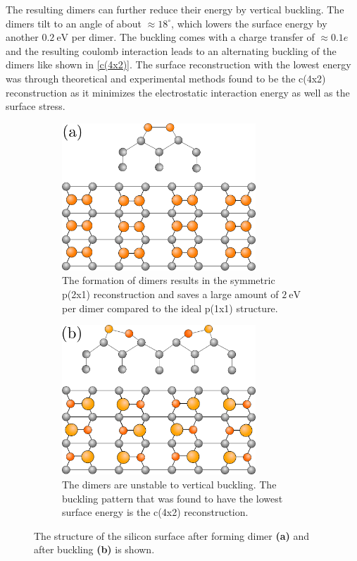	The resulting dimers can further reduce their energy by vertical buckling. The dimers tilt to an angle of about $\approx 18^\circ$, which lowers the surface energy by another $0.2~\text{eV}$ per dimer. The buckling comes with a charge transfer of $\approx0.1 e$  \cite{brand2023critical, landemark1992core} and the resulting coulomb interaction leads to an alternating buckling of the dimers like shown in \autoref{c(4x2)}. The surface reconstruction with the lowest energy was through theoretical \cite{ramstad1995theoretical} and experimental \cite{brand2023critical} methods found to be the c(4x2) reconstruction as it minimizes the electrostatic interaction energy as well as the surface stress. 
	\begin{figure}[htb]
		\begin{subfigure}{0.5\textwidth}
			\centering
			\includegraphics[width=0.8\textwidth]{graphics/p(2x1)-sym.png}
			\caption{The formation of dimers results in the symmetric p(2x1) reconstruction and saves a large amount of $2~\text{eV}$ per dimer compared to the ideal p(1x1) structure.}
			\label{p(2x1)-symmetric}
		\end{subfigure}
		\begin{subfigure}{0.5\textwidth}
		\centering
		\includegraphics[width=0.8\textwidth]{graphics/c(4x2).png}
		\caption{The dimers are unstable to vertical buckling. The buckling pattern that was found to have the lowest surface energy is the c(4x2) reconstruction.}
		\label{c(4x2)}
		\end{subfigure}
		\caption{The structure of the silicon surface after forming dimer \textbf{(a)} and after buckling \textbf{(b)} is shown.}
		\label{Fig::dimer-configs}
	\end{figure}
